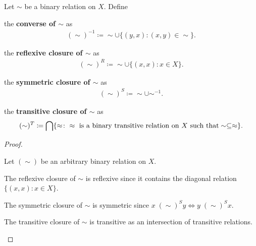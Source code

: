 \begin{definition}\label{def:derived_relations}
  Let \( \sim \) be a binary relation on \( X \). Define
  \begin{defenum}
    \item\label{def:derived_relations/converse} the \textbf{converse of \( \sim \)} as
    \begin{align*}
      (\sim)^{-1} \coloneqq \sim \cup \{ (y, x) \colon (x, y) \in \sim \}.
    \end{align*}

    \item\label{def:derived_relations/reflexive} the \textbf{reflexive closure of \( \sim \)} as
    \begin{align*}
      (\sim)^R \coloneqq \sim \cup \{ (x, x) \colon x \in X \}.
    \end{align*}

    \item\label{def:derived_relations/symmetric} the \textbf{symmetric closure of \( \sim \)} as
    \begin{align*}
      (\sim)^S \coloneqq \sim \cup \sim^{-1}.
    \end{align*}

    \item\label{def:derived_relations/transitive} the \textbf{transitive closure of \( \sim \)} as
    \begin{align*}
      (\sim)^T \coloneqq \bigcap \{ \approx \colon \approx \text{ is a binary transitive relation on \( X \) such that} \sim \subseteq \approx \}.
    \end{align*}
  \end{defenum}
\end{definition}
\begin{proof}
\begin{itemize}
  Let \( (\sim) \) be an arbitrary binary relation on \( X \).

  \begin{description}
     The reflexive closure of \( \sim \) is reflexive since it contains the diagonal relation \( \{ (x, x) \colon x \in X \} \).

     The symmetric closure of \( \sim \) is symmetric since \( x \;(\sim)^S y \iff y \;(\sim)^S x \).

     The transitive closure of \( \sim \) is transitive as an intersection of transitive relations.
  \end{description}
\end{itemize}
\end{proof}
